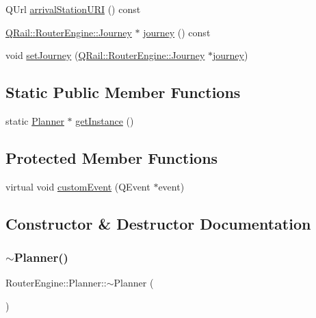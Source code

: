 \begin{DoxyCompactItemize}
\item 
Q\+Url \mbox{\hyperlink{classQRail_1_1RouterEngine_1_1Planner_ad9d45f498635d0310c699d9154c68b38}{arrival\+Station\+U\+RI}} () const
\item 
\mbox{\hyperlink{classQRail_1_1RouterEngine_1_1Journey}{Q\+Rail\+::\+Router\+Engine\+::\+Journey}} $\ast$ \mbox{\hyperlink{classQRail_1_1RouterEngine_1_1Planner_af3ae9c83f09d8dadabe6d0e24b22401e}{journey}} () const
\item 
void \mbox{\hyperlink{classQRail_1_1RouterEngine_1_1Planner_af4aefc8b116590f0641da489e0c8832a}{set\+Journey}} (\mbox{\hyperlink{classQRail_1_1RouterEngine_1_1Journey}{Q\+Rail\+::\+Router\+Engine\+::\+Journey}} $\ast$\mbox{\hyperlink{classQRail_1_1RouterEngine_1_1Planner_af3ae9c83f09d8dadabe6d0e24b22401e}{journey}})
\end{DoxyCompactItemize}
\subsection*{Static Public Member Functions}
\begin{DoxyCompactItemize}
\item 
static \mbox{\hyperlink{classQRail_1_1RouterEngine_1_1Planner}{Planner}} $\ast$ \mbox{\hyperlink{classQRail_1_1RouterEngine_1_1Planner_a75095e9f6b6c02097fefef1654bf9b27}{get\+Instance}} ()
\end{DoxyCompactItemize}
\subsection*{Protected Member Functions}
\begin{DoxyCompactItemize}
\item 
virtual void \mbox{\hyperlink{classQRail_1_1RouterEngine_1_1Planner_a2a6a93bae30063f03c439c8761e462fa}{custom\+Event}} (Q\+Event $\ast$event)
\end{DoxyCompactItemize}


\subsection{Constructor \& Destructor Documentation}
\mbox{\label{classQRail_1_1RouterEngine_1_1Planner_a3ef159b1f214b7e7f2aecb94d1a2bbed}} 
\subsubsection{\texorpdfstring{$\sim$Planner()}{~Planner()}}
{\footnotesize\ttfamily Router\+Engine\+::\+Planner\+::$\sim$\+Planner (\begin{DoxyParamCaption}{ }\end{DoxyParamCaption})}



